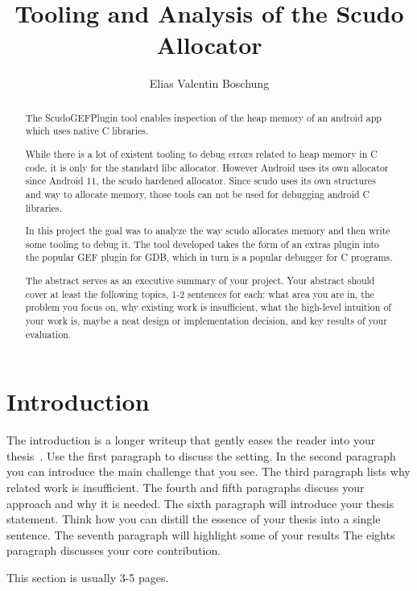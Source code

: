 \documentclass[a4paper,11pt,oneside]{report}
\title{Tooling and Analysis of the Scudo Allocator}
\author{Elias Valentin Boschung}
\newcommand{\sysname}{ScudoGEFPlugin\xspace}
\begin{document}
\maketitle
\makededication
\makeacks

\begin{abstract}
  The \sysname tool enables inspection of the heap memory of an android app
  which uses native C libraries.

  While there is a lot of existent tooling to debug errors related to heap
  memory in C code, it is only for the standard libc allocator. However
  Android uses its own allocator since Android 11, the scudo hardened
  allocator. Since scudo uses its own structures and way to allocate memory,
  those tools can not be used for debugging android C libraries.

  In this project the goal was to analyze the way scudo allocates memory and
  then write some tooling to debug it. The tool developed takes the form of
  an extras plugin into the popular GEF plugin for GDB, which in turn is a
  popular debugger for C programs.
  
The abstract serves as an executive summary of your project.
Your abstract should cover at least the following topics, 1-2 sentences for
each: what area you are in, the problem you focus on, why existing work is
insufficient, what the high-level intuition of your work is, maybe a neat
design or implementation decision, and key results of your evaluation.
\end{abstract}

\maketoc

\chapter{Introduction}

The introduction is a longer writeup that gently eases the reader into your
thesis~\cite{dinesh20oakland}. Use the first paragraph to discuss the setting.
In the second paragraph you can introduce the main challenge that you see.
The third paragraph lists why related work is insufficient.
The fourth and fifth paragraphs discuss your approach and why it is needed.
The sixth paragraph will introduce your thesis statement. Think how you can
distill the essence of your thesis into a single sentence.
The seventh paragraph will highlight some of your results
The eights paragraph discusses your core contribution.

This section is usually 3-5 pages.
\end{document}
